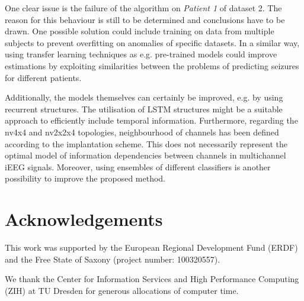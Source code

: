 \documentclass[a4paper, conference]{IEEEtran}
\begin{document}
One clear issue is the failure of the algorithm on \textit{Patient 1} of dataset 2. The reason for this behaviour is still to be determined and conclusions have to be drawn. One possible solution could include training on data from multiple subjects to prevent overfitting on anomalies of specific datasets. In a similar way, using transfer learning techniques as e.g. pre-trained models could improve estimations by exploiting similarities between the problems of predicting seizures for different patients.

Additionally, the models themselves can certainly be improved, e.g. by using recurrent structures. The utilisation of LSTM structures might be a suitable approach to efficiently include temporal information. Furthermore, regarding the nv4x4 and nv2x2x4 topologies, neighbourhood of channels has been defined according to the implantation scheme. This does not necessarily represent the optimal model of information dependencies between channels in multichannel iEEG signals. Moreover, using ensembles of different classifiers is another possibility to improve the proposed method.

\section*{Acknowledgements}
This work was supported by the European Regional Development Fund (ERDF) and the Free State of Saxony (project number: 100320557).

We thank the Center for Information Services and High Performance Computing (ZIH) at TU Dresden for generous allocations of computer time.



\end{document}
